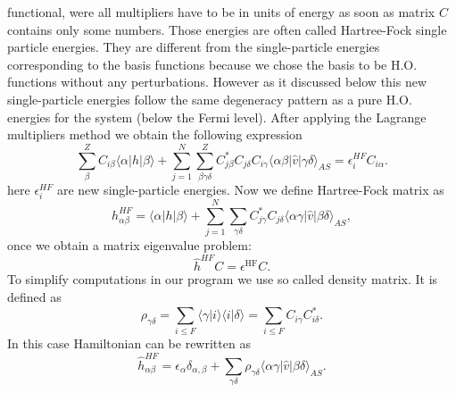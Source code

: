 functional, were all multipliers have to be in units of energy as soon
as matrix $C$ contains only some numbers. Those energies are often
called Hartree-Fock single particle energies. They are different from
the single-particle energies corresponding to the basis functions
because we chose the basis to be H.O. functions without any
perturbations. However as it discussed below this new single-particle
energies follow the same degeneracy pattern as a pure H.O. energies
for the system (below the Fermi level).  After applying the Lagrange
multipliers method we obtain the following expression
\begin{equation}
\sum_{\beta}^Z C_{i\beta}\langle \alpha | h | \beta \rangle+
\sum_{j=1}^N\sum_{\beta\gamma\delta}^Z C^*_{j\beta}C_{j\delta}C_{i\gamma}\langle \alpha\beta|\hat{v}|\gamma\delta\rangle_{AS}=\epsilon_i^{HF}C_{i\alpha}.
\end{equation}
here $\epsilon_i^{HF}$ are new single-particle energies. Now we define Hartree-Fock matrix as
\begin{equation}
h_{\alpha\beta}^{HF}=\langle \alpha | h | \beta \rangle+
\sum_{j=1}^N\sum_{\gamma\delta} C^*_{j\gamma}C_{j\delta}\langle \alpha\gamma|\hat{v}|\beta\delta\rangle_{AS},
\end{equation}
once we obtain a matrix eigenvalue problem:
\begin{equation} \label{eig}
\hat{h}^{HF}C=\epsilon^{\mathrm{HF}}C.
\end{equation}
To simplify computations in our program we use so called density matrix. It is defined as
\begin{equation} \label{dens}
\rho_{\gamma\delta}=\sum_{i\le F}\langle\gamma|i\rangle\langle i|\delta\rangle = \sum_{i\le F}C_{i\gamma}C^*_{i\delta}.
\end{equation}
In this case Hamiltonian can be rewritten as 
\begin{equation}
\hat{h}_{\alpha\beta}^{HF}=\epsilon_{\alpha}\delta_{\alpha,\beta}+
\sum_{\gamma\delta} \rho_{\gamma\delta}\langle \alpha\gamma|\hat{v}|\beta\delta\rangle_{AS}.
\end{equation}
